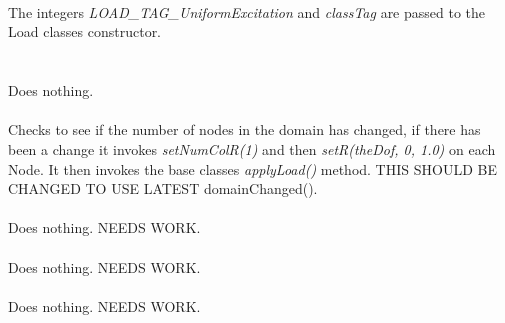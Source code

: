  \\ 
\\ \\
The integers {\em LOAD\_TAG\_UniformExcitation} and {\em classTag} are
passed to the Load classes constructor. \\

 \\
\\ 
Does nothing. \\

 \\ 
Checks to see if the number of nodes in the domain has changed, if
there has been a change it invokes {\em setNumColR(1)} and then 
{\em setR(theDof, 0, 1.0)} on each Node. It then invokes the base classes {\em
applyLoad()} method. THIS SHOULD BE CHANGED TO USE LATEST domainChanged().\\

\\
Does nothing. NEEDS WORK. \\

\\
Does nothing. NEEDS WORK. \\

\\
Does nothing. NEEDS WORK. 

